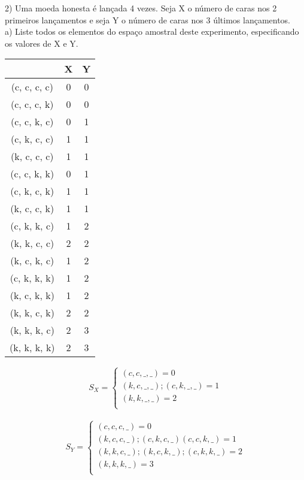 \documentclass[12pt,a4paper,draft]{article}
\begin{document}
	\vspace{1cm}
	2) Uma moeda honesta é lançada 4 vezes. Seja X o número de caras nos 2 primeiros lançamentos e seja Y o número de caras nos 3 últimos lançamentos.\\
	a) Liste todos os elementos do espaço amostral deste experimento, especificando os valores de X e Y.\\
	\begin{center}
		\begin{tabular}{ccc}\midrule
			& X & Y\\ \midrule
			(c, c, c, c) & 0 & 0\\ \midrule
			(c, c, c, k) & 0 & 0\\ \midrule
			(c, c, k, c) & 0 & 1\\ \midrule
			(c, k, c, c) & 1 & 1\\ \midrule
			(k, c, c, c) & 1 & 1\\ \midrule
			(c, c, k, k) & 0 & 1\\ \midrule
			(c, k, c, k) & 1 & 1\\ \midrule
			(k, c, c, k) & 1 & 1\\ \midrule
			(c, k, k, c) & 1 & 2\\ \midrule
			(k, k, c, c) & 2 & 2\\ \midrule
			(k, c, k, c) & 1 & 2\\ \midrule
			(c, k, k, k) & 1 & 2\\ \midrule
			(k, c, k, k) & 1 & 2\\ \midrule
			(k, k, c, k) & 2 & 2\\ \midrule
			(k, k, k, c) & 2 & 3\\ \midrule
			(k, k, k, k) & 2 & 3\\ \midrule
		\end{tabular}
	\end{center}
	\vspace{0.5cm}
	\[
	S_{X} =
	\begin{cases}
	(c, c, \_, \_) = 0\\
	(k, c, \_, \_); (c, k, \_, \_) = 1\\
	(k, k, \_, \_) = 2\\
	\end{cases}
	\]
	\vspace{0.5cm}\\
	\[
	S_{Y} =
	\begin{cases}
	(c, c, c, \_) = 0\\
	(k, c, c, \_); (c, k, c, \_) (c, c, k, \_) = 1\\
	(k, k, c, \_); (k, c, k, \_); (c, k, k, \_) = 2\\
	(k, k, k, \_) = 3\\
	\end{cases}
	\]
\end{document}
